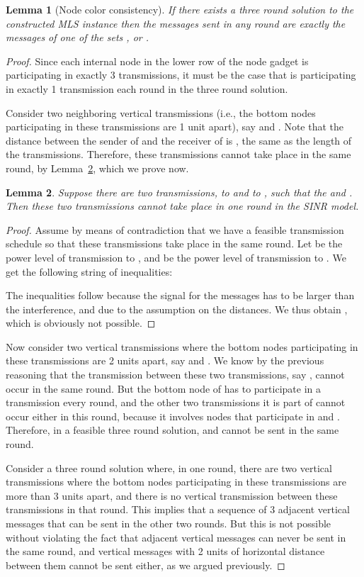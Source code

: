 \documentclass{article}
\newtheorem{lemma}{Lemma}
\begin{document}
\begin{lemma}[Node color consistency]
If there exists a three round solution to the constructed MLS instance then the messages sent in any round are exactly the messages of one of the sets ,  or .
\end{lemma}
\begin{proof}
Since each internal node in the lower row of the node gadget is participating in exactly 3 transmissions, it must be the case that is participating in exactly 1 transmission each round in the three round solution.

Consider two neighboring vertical transmissions (i.e., the bottom nodes participating in these transmissions are 1 unit apart), say  and . Note that the distance between the sender of  and the receiver of  is , the same as the length of the transmissions. Therefore, these transmissions cannot take place in the same round, by Lemma~\ref{crossinglemma}, which we prove now.

\begin{lemma}\label{crossinglemma}
Suppose there are two transmissions,  to  and  to , such that the  and .  Then these two transmissions cannot take place in one round in the SINR model.
\end{lemma}
\begin{proof}
Assume by means of contradiction that we have a feasible transmission schedule so that these transmissions take place in the same round.
Let  be the power level of transmission  to , and  be the power level of transmission  to . We get the following string of inequalities:

The inequalities follow because the signal for the messages has to be larger than the interference, and due to the assumption on the distances. We thus obtain , which is obviously not possible.
\end{proof}



Now consider two vertical transmissions where the bottom nodes participating in these transmissions are 2 units apart, say  and . We know by the previous reasoning that the transmission between these two transmissions, say , cannot occur in the same round. But the bottom node of  has to participate in a transmission every round, and the other two transmissions it is part of cannot occur either in this round, because it involves nodes that participate in  and . Therefore, in a feasible three round solution,  and  cannot be sent in the same round.

Consider a three round solution where, in one round, there are two vertical transmissions where the bottom nodes participating in these transmissions are more than 3 units apart, and there is no vertical transmission between these transmissions in that round. This implies that a sequence of 3 adjacent vertical messages that can be sent in the other two rounds. But this is not possible without violating the fact that adjacent vertical messages can never be sent in the same round, and vertical messages with 2 units of horizontal distance between them cannot be sent either, as we argued previously.


\end{proof}
\end{document}
